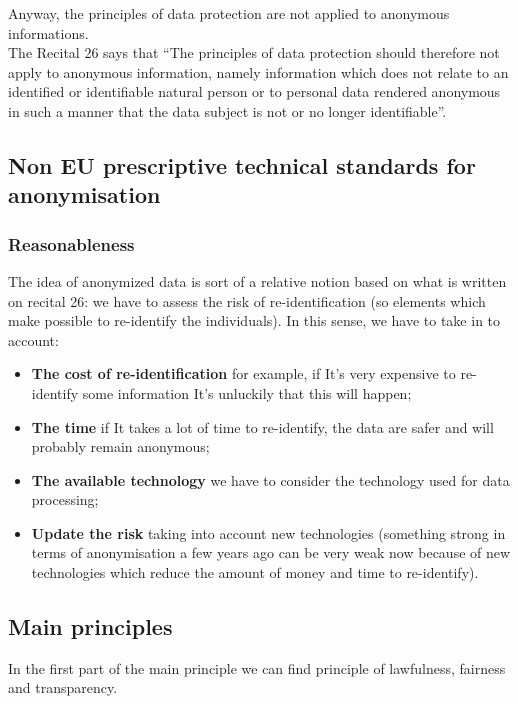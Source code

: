 Anyway, the principles of data protection are not applied to anonymous informations.\\
The Recital 26 says that “The principles of data protection should therefore not apply to anonymous information, namely information which does not relate to an identified or identifiable natural person or to personal data rendered anonymous in such a manner that the data subject is
not or no longer identifiable”.
\subsection{Non EU prescriptive technical standards for anonymisation
}
\subsubsection{Reasonableness}
The idea of anonymized data is sort of a relative notion based on what is written on recital 26: we have to assess the risk of re-identification (so elements which make possible to re-identify the individuals).
In this sense, we have to take in to account:
\begin{itemize}
    \item \textbf{The cost of re-identification} for example, if It’s very expensive to re-identify some information It’s unluckily that this will happen;
    \item \textbf{The time} if It takes a lot of time to re-identify, the data are safer and will probably remain anonymous;
    \item \textbf{The available technology} we have to consider the technology used for data processing;
    \item \textbf{Update the risk} taking into account new technologies (something strong in terms of anonymisation a few years ago can be very weak now because of new technologies which reduce the amount of money and time to re-identify).
\end{itemize}

\subsection{Main principles}
In the first part of the main principle we can find principle of lawfulness, fairness and transparency.
